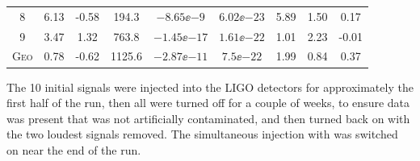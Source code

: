 \begin{table}[!htbp]
\begin{center}
\begin{tabular}{c | c c c c c c c c}
\footnotesize{8} & \footnotesize{6.13} & \footnotesize{-0.58} & \footnotesize{194.3} &
\footnotesize{$-8.65\ee{-9}$} & \footnotesize{$6.02\ee{-23}$} & \footnotesize{5.89} &
\footnotesize{1.50} & \footnotesize{0.17} \\
\footnotesize{9} & \footnotesize{3.47} & \footnotesize{1.32} & \footnotesize{763.8} &
\footnotesize{$-1.45\ee{-17}$} & \footnotesize{$1.61\ee{-22}$} & \footnotesize{1.01} &
\footnotesize{2.23} & \footnotesize{-0.01} \\
\footnotesize{G\textsc{eo}} & \footnotesize{0.78} & \footnotesize{-0.62} & \footnotesize{1125.6} &
\footnotesize{$-2.87\ee{-11}$} & \footnotesize{$7.5\ee{-22}$} & \footnotesize{1.99} &
\footnotesize{0.84} & \footnotesize{0.37} \\
\hline
\end{tabular}
\end{center}
\end{table}
The 10 initial signals were injected into the LIGO detectors for approximately the first half of the
run, then all were turned off for a couple of weeks, to ensure data was present that was not
artificially contaminated, and then turned back on with the two loudest signals removed. The
simultaneous injection with \geo was switched on near the end of the run. 

